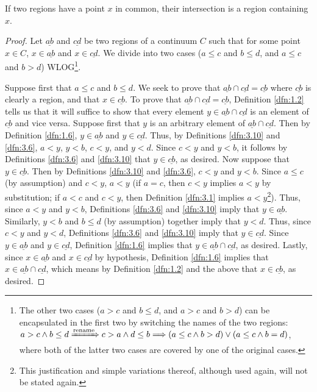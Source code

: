 \documentclass[../main.tex]{subfiles}
\begin{document}
\begin{theorem}\label{trm:3.18}
    If two regions have a point $x$ in common, their intersection is a region containing $x$.
    \begin{proof}
        Let $\underline{ab}$ and $\underline{cd}$ be two regions of a continuum $C$ such that for some point $x\in C$, $x\in\underline{ab}$ and $x\in\underline{cd}$. We divide into two cases ($a\leq c$ and $b\leq d$, and $a\leq c$ and $b>d$) WLOG\footnote{The other two cases ($a>c$ and $b\leq d$, and $a>c$ and $b>d$) can be encapsulated in the first two by switching the names of the two regions: $
            a>c\wedge b\leq d \xRightarrow{\text{rename}} c>a\wedge d\leq b
            \Longrightarrow (a\leq c\wedge b>d)\vee(a\leq c\wedge b=d)
        $, where both of the latter two cases are covered by one of the original cases.}.\par
        Suppose first that $a\leq c$ and $b\leq d$. We seek to prove that $\underline{ab}\cap\underline{cd}=\underline{cb}$ where $\underline{cb}$ is clearly a region, and that $x\in\underline{cb}$. To prove that $\underline{ab}\cap\underline{cd}=\underline{cb}$, Definition \ref{dfn:1.2} tells us that it will suffice to show that every element $y\in\underline{ab}\cap\underline{cd}$ is an element of $\underline{cb}$ and vice versa. Suppose first that $y$ is an arbitrary element of $\underline{ab}\cap\underline{cd}$. Then by Definition \ref{dfn:1.6}, $y\in\underline{ab}$ and $y\in\underline{cd}$. Thus, by Definitions \ref{dfn:3.10} and \ref{dfn:3.6}, $a<y$, $y<b$, $c<y$, and $y<d$. Since $c<y$ and $y<b$, it follows by Definitions \ref{dfn:3.6} and \ref{dfn:3.10} that $y\in\underline{cb}$, as desired. Now suppose that $y\in\underline{cb}$. Then by Definitions \ref{dfn:3.10} and \ref{dfn:3.6}, $c<y$ and $y<b$. Since $a\leq c$ (by assumption) and $c<y$, $a<y$ (if $a=c$, then $c<y$ implies $a<y$ by substitution; if $a<c$ and $c<y$, then Definition \ref{dfn:3.1} implies $a<y$\footnote{This justification and simple variations thereof, although used again, will not be stated again.}). Thus, since $a<y$ and $y<b$, Definitions \ref{dfn:3.6} and \ref{dfn:3.10} imply that $y\in\underline{ab}$. Similarly, $y<b$ and $b\leq d$ (by assumption) together imply that $y<d$. Thus, since $c<y$ and $y<d$, Definitions \ref{dfn:3.6} and \ref{dfn:3.10} imply that $y\in\underline{cd}$. Since $y\in\underline{ab}$ and $y\in\underline{cd}$, Definition \ref{dfn:1.6} implies that $y\in\underline{ab}\cap\underline{cd}$, as desired. Lastly, since $x\in\underline{ab}$ and $x\in\underline{cd}$ by hypothesis, Definition \ref{dfn:1.6} implies that $x\in\underline{ab}\cap\underline{cd}$, which means by Definition \ref{dfn:1.2} and the above that $x\in\underline{cb}$, as desired.\par

\end{proof}
\end{theorem}
\end{document}
